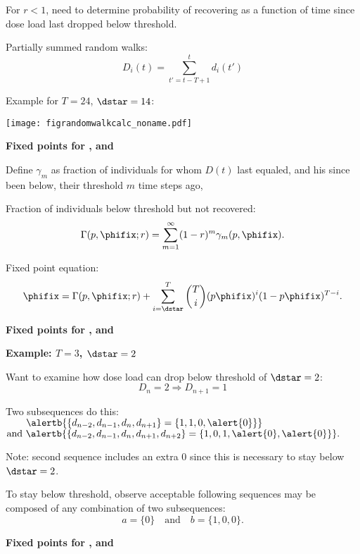    For $r < 1$, need to determine probability of
    recovering as a function of time since 
    dose load last dropped below threshold.
  
    Partially summed random walks:
    $$
    D_i(t) = \sum_{t'=t-T+1}^{t} d_i(t')
    $$
  
    Example for $T=24$, $\dstar=14$:
          
      
      \texttt{[image: figrandomwalkcalc\_noname.pdf]}
      


  \textbf{Fixed points for , and }

  
  
    Define $\gamma_m$ as fraction of individuals 
    for whom $D(t)$ last equaled, and his since been
    below, their threshold $m$ time steps ago,
  
    Fraction of individuals below threshold but not recovered:
    $$
    \Gamma(p,\phifix;r) = \sum_{m=1}^{\infty} (1-r)^m \gamma_m(p,\phifix).
    $$
  
    Fixed point equation:
    $$
    \phifix = \Gamma(p,\phifix;r) 
    + \sum_{i=\dstar}^{T}
    \binom{T}{i}
    (p\phifix)^{i} (1 - p\phifix)^{T-i}.
    $$
  



  \textbf{Fixed points for , and }

  \textbf{Example: $T=3$, $\dstar=2$}
    
     
      Want to examine how dose load can drop below threshold of $\dstar=2$:
      $$D_n=2 \Rightarrow D_{n+1}=1$$
     
      Two subsequences do this:
      {
        $
        \qquad \alertb{\{d_{n-2},d_{n-1},d_{n},d_{n+1}\} = \{1,1,0,\alert{0}\}}
        $
      }
      {
        $
        \mbox{and} \ \alertb{\{d_{n-2},d_{n-1},d_{n},d_{n+1},d_{n+2}\} 
          = \{1,0,1,\alert{0},\alert{0}\}}.
        $
      }
    
      Note: second sequence includes an extra 0 since
      this is necessary to stay below $\dstar=2$.
    
      To stay below threshold, observe
      acceptable following sequences may be composed of
      any combination of two subsequences:
      $$ 
      a=\{0\} \quad \mbox{and} \quad b=\{1,0,0\}. 
      $$
    
  


  \textbf{Fixed points for , and }

